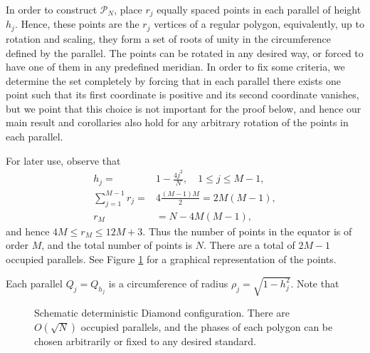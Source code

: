 \documentclass[11pt]{amsart}
\newcommand{\cP}{\mathcal P}
\begin{document}
 In order to construct $\cP_N$, place $r_j$ equally spaced points in each parallel of height $h_j$. Hence, these points are the $r_j$ vertices of a regular polygon, equivalently, up to rotation and scaling, they form a set of roots of unity in the circumference defined by the
parallel. The points can be rotated in any desired way, or forced to have one of them in any predefined meridian. In order to fix some criteria, we determine the set completely by forcing that in each parallel there exists one point such that its first coordinate is positive and its second coordinate vanishes, but we point that this choice is not important for the proof below, and hence our main result and corollaries also hold for any arbitrary rotation of the points in each parallel.

For later use, observe that
\begin{align*}
h_j=&1-\frac{4j^2}N,\quad 1\leq j\leq M-1,\\
 \sum_{j=1}^{M-1}r_j
 =&4\frac{(M-1)M}{2}=2M(M-1),\\
 r_M&=N-4M(M-1),
\end{align*}
and hence $4M\le r_M\le12M+3.$ Thus the number of points in the equator is of order $M$, and the total number of points is $N$. There are a total of $2M-1$ occupied parallels. See Figure \ref{fig:bemoc} for a graphical representation of the  points.

Each parallel $Q_j=Q_{h_j}$ is a circumference of radius $\rho_j=\sqrt{1-h_j^2}$. Note that


\begin{figure}[t]
\centering
{}
\caption{Schematic deterministic Diamond configuration.  There are $O(\sqrt N)$ occupied
parallels, and the phases of each polygon can be chosen arbitrarily or fixed to any desired standard.}
\label{fig:bemoc}
\end{figure}
\end{document}
